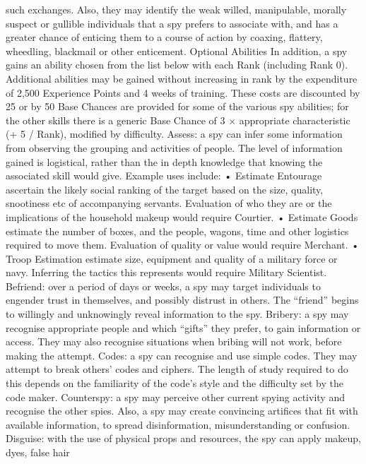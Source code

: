 \documentclass[a4paper]{article}
\begin{document}
\begin{multicols}{3}
such exchanges. Also, they may identify the weak
willed, manipulable, morally suspect or gullible
individuals that a spy prefers to associate with, and
has a greater chance of enticing them to a course of
action by coaxing, flattery, wheedling, blackmail
or other enticement.
Optional Abilities
In addition, a spy gains an ability chosen from the
list below with each Rank (including Rank 0).
Additional abilities may be gained without increasing in rank by the expenditure of 2,500 Experience
Points and 4 weeks of training. These costs are
discounted by 25%
or by 50%
Base Chances are provided for some of the various
spy abilities; for the other skills there is a generic
Base Chance of 3 × appropriate characteristic (+ 5 /
Rank), modified by difficulty.
Assess: a spy can infer some information from
observing the grouping and activities of people.
The level of information gained is logistical, rather
than the in depth knowledge that knowing the
associated skill would give. Example uses include:
• Estimate Entourage ascertain the likely social
ranking of the target based on the size, quality,
snootiness etc of accompanying servants. Evaluation of who they are or the implications of the
household makeup would require Courtier.
• Estimate Goods estimate the number of boxes,
and the people, wagons, time and other logistics
required to move them. Evaluation of quality or
value would require Merchant.
• Troop Estimation estimate size, equipment and
quality of a military force or navy. Inferring the
tactics this represents would require Military Scientist.
Befriend: over a period of days or weeks, a spy
may target individuals to engender trust in themselves, and possibly distrust in others. The “friend”
begins to willingly and unknowingly reveal information to the spy.
Bribery: a spy may recognise appropriate people
and which “gifts” they prefer, to gain information
or access. They may also recognise situations when
bribing will not work, before making the attempt.
Codes: a spy can recognise and use simple codes.
They may attempt to break others’ codes and ciphers. The length of study required to do this depends on the familiarity of the code’s style and the
difficulty set by the code maker.
Counterspy: a spy may perceive other current
spying activity and recognise the other spies. Also,
a spy may create convincing artifices that fit with
available information, to spread disinformation,
misunderstanding or confusion.
Disguise: with the use of physical props and resources, the spy can apply makeup, dyes, false hair

\end{multicols}
\end{document}
